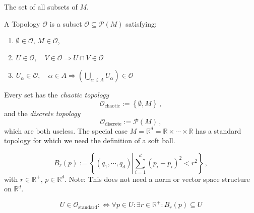 \documentclass[11pt, a4paper, twocolumn]{article} %
\begin{document}
\begin{defn}
    The set of all subsets of $M$.
\end{defn}

\begin{defn}[Topology]
    A Topology $\mathcal{O}$ is a subset $\mathcal{O} \subseteq \mathcal{P}(M)$ satisfying:
    \begin{enumerate}
        \item $\emptyset \in \mathcal{O}$, $M\in\mathcal{O}$,
        \item $U\in\mathcal{O},\quad V\in\mathcal{O}\Rightarrow U\cap V\in\mathcal{O}$
        \item $U_\alpha\in\mathcal{O},\quad \alpha\in A \Rightarrow
            \left( \bigcup\limits_{\alpha\in A} U_\alpha \right) \in \mathcal{O}$
    \end{enumerate}
\end{defn}

Every set has the \textit{chaotic topology}
\begin{equation}
    \mathcal{O}_\text{chaotic} := \left\{ \emptyset, M \right\}\,,
\end{equation}
and the \textit{discrete topology}
\begin{equation}
    \mathcal{O}_\text{discrete} := \mathcal{P}(M)\,,
\end{equation}
which are both useless.
The special case $M = \mathbb{R}^d = \mathbb{R} \times \cdots \times \mathbb{R}$ has a standard topology
for which we need the definition of a soft ball.
\begin{defn}
   \begin{equation}
   B_r(p) := \left\{ (q_1,\cdots,q_d) \left| \sum_{i=1}^{d}(p_i-p_i)^2 < r^2\right. \right\}\,,
   \end{equation} 
   with $r\in \mathbb{R}^+$, $p\in\mathbb{R}^d$.
   Note: This does not need a norm or vector space structure on $\mathbb{R}^d$.
\end{defn}
\begin{defn}
    \begin{equation}
        U \in \mathcal{O}_\text{standard} :\Leftrightarrow \forall p\in U:
        \exists r\in\mathbb{R}^+ : B_r(p) \subseteq U
    \end{equation}
\end{defn}
\end{document}
